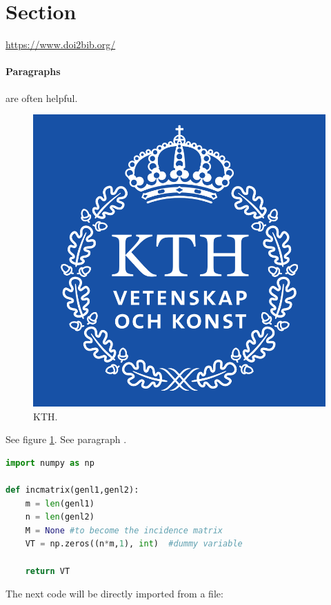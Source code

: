 \section{Section}

\cite{google}

\href{https://www.doi2bib.org/}{https://www.doi2bib.org/}

\paragraph{Paragraphs}\label{para:paragraph} are often helpful.

\begin{figure}[h]
    \begin{center}
        \includegraphics[scale=0.2]{figures/kth.png}
    \end{center}
    \caption{KTH.}
    \label{fig:kth}
\end{figure}

See figure \ref{fig:kth}.
See paragraph .


\begin{lstlisting}[language=Python, caption=Python example]
import numpy as np
    
def incmatrix(genl1,genl2):
    m = len(genl1)
    n = len(genl2)
    M = None #to become the incidence matrix
    VT = np.zeros((n*m,1), int)  #dummy variable
    
    return VT
\end{lstlisting}

The next code will be directly imported from a file:


\lipsum[1-7]